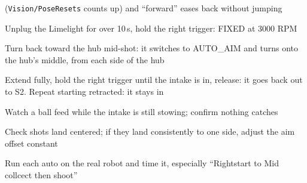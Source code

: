 \documentclass[11pt]{article}
\newcommand{\dash}[1]{\texttt{#1}}
\begin{document}
\begin{checklist}
    (\dash{Vision/PoseResets} counts up) and ``forward'' eases back without jumping
  \item Unplug the Limelight for over 10\,s, hold the right trigger: FIXED at 3000 RPM
  \item Turn back toward the hub mid-shot: it switches to AUTO\_AIM and turns onto the hub's
    middle, from each side of the hub
  \item Extend fully, hold the right trigger until the intake is in, release: it goes back out to
    S2. Repeat starting retracted: it stays in
  \item Watch a ball feed while the intake is still stowing; confirm nothing catches
  \item Check shots land centered; if they land consistently to one side, adjust the aim offset
    constant
  \item Run each auto on the real robot and time it, especially ``Rightstart to Mid collcect then
    shoot''
\end{checklist}
\end{document}
